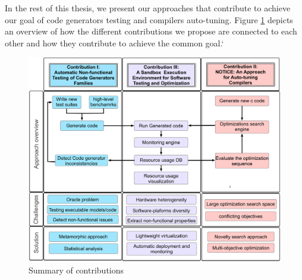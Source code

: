 

In the rest of this thesis, we present our approaches that contribute to achieve our goal of code generators testing and compilers auto-tuning. Figure \ref{fig:overview} depicts an overview of how the different contributions we propose are connected to each other and how they contribute to achieve the common goal.`

\begin{figure}[h]
	\center
	\includegraphics[scale=0.23]{Chapitre0/fig/overview}
	\caption{Summary of contributions}
	\label{fig:overview}
\end{figure}


